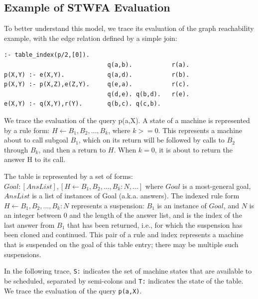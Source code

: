 \subsection{Example of STWFA Evaluation}

To better understand this model, we trace its evaluation of the graph
reachability example, with the edge relation defined by a simple join:
\footnotesize
\begin{verbatim}
:- table_index(p/2,[0]).
                             q(a,b).           r(a).
p(X,Y) :- e(X,Y).            q(a,d).           r(b).
p(X,Y) :- p(X,Z),e(Z,Y).     q(e,a).           r(c).
                             q(d,e). q(b,d).   r(e).
e(X,Y) :- q(X,Y),r(Y).       q(b,c). q(c,b).
\end{verbatim}
\normalsize

We trace the evaluation of the query p(a,X).  A state of a machine is
represented by a rule form: $H\leftarrow B_1,B_2,...,B_k$, where $k>=0$.
This represents a machine about to call subgoal $B_1$, which on its
return will be followed by calls to $B_2$ through $B_k$, and then a
return to $H$.  When $k=0$, it is about to return the answer H to its
call.

The table is represented by a set of forms: $Goal:[AnsList],[H\leftarrow
  B_1,B_2,...,B_k:N,...]$ where $Goal$ is a most-general goal,
$AnsList$ is a list of instances of Goal (a.k.a. answers). The indexed
rule form $H\leftarrow B_1,B_2,...,B_k:N$ represents a suspension:
$B_1$ is an instance of $Goal$, and $N$ is an integer between $0$ and
the length of the answer list, and is the index of the last answer
from $B_1$ that has been returned, i.e., for which the suspension has
been cloned and continued.  This pair of a rule and index represents a
machine that is suspended on the goal of this table entry; there may
be multiple such suspensions.

In the following trace, \verb|S:| indicates the set of machine states
that are available to be scheduled, separated by semi-colons and
\verb|T:| indicates the state of the table.  We trace the evaluation
of the query \verb|p(a,X)|.

